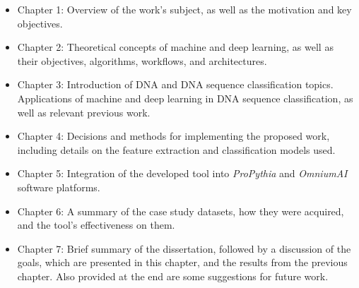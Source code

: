 \begin{itemize}
    \item Chapter 1: Overview of the work's subject, as well as the motivation and key objectives.
    \item Chapter 2: Theoretical concepts of machine and deep learning, as well as their objectives, algorithms, workflows, and architectures. 
    \item Chapter 3: Introduction of DNA and DNA sequence classification topics. Applications of machine and deep learning in DNA sequence classification, as well as relevant previous work.
    \item Chapter 4: Decisions and methods for implementing the proposed work, including details on the feature extraction and classification models used. 
    \item Chapter 5: Integration of the developed tool into \textit{ProPythia} and \textit{OmniumAI} software platforms.
    \item Chapter 6: A summary of the case study datasets, how they were acquired, and the tool's effectiveness on them.
    \item Chapter 7: Brief summary of the dissertation, followed by a discussion of the goals, which are presented in this chapter, and the results from the previous chapter. Also provided at the end are some suggestions for future work.
\end{itemize}